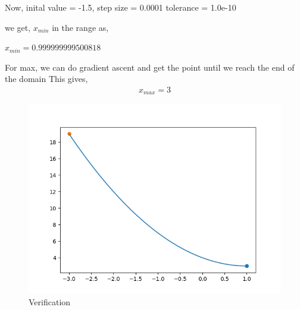 \documentclass[journal]{IEEEtran}
\begin{document}
Now,
inital value = -1.5,
step size = 0.0001
tolerance = 1.0e-10

we get, $x_{min}$ in the range as,

$x_{min} = 0.999999999500818$

For max, we can do gradient ascent and get the point until we reach the end of the domain
This gives,
\begin{align}
    x_{max} = 3    
\end{align}


\begin{figure}[ht]  
    \centering  
    \includegraphics[width=\columnwidth]{figs/fig2.png}  
    \caption{Verification}
\end{figure}
    
\end{document}
